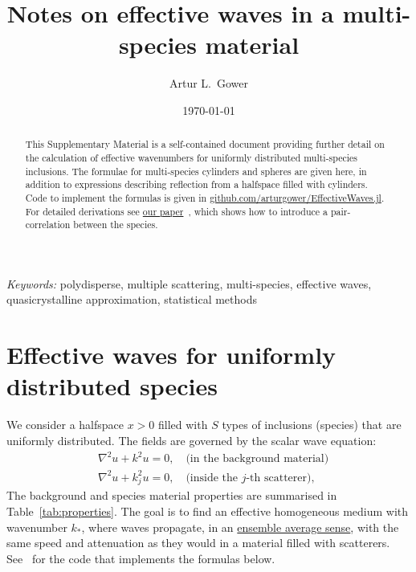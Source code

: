 \documentclass[12pt, a4paper]{article}
\begin{document}
\title{Notes on effective waves in a multi-species material}


\author[$\dagger$]{Artur L.\ Gower}


\date{\today}
\maketitle

\begin{abstract}
This Supplementary Material is a self-contained document providing further detail on the  calculation of effective wavenumbers for uniformly distributed multi-species inclusions. The formulae for multi-species cylinders and spheres are given here, in addition to expressions describing reflection from a halfspace filled with cylinders. Code to implement the formulas is given in \url{github.com/arturgower/EffectiveWaves.jl}.  For detailed derivations see \href{https://arxiv.org/abs/1712.05427}{our paper}~\parencite{gower_reflection_2017}, which shows how to introduce a pair-correlation between the species.
\end{abstract}

\noindent
{\textit{Keywords:} polydisperse, multiple scattering, multi-species, effective waves, quasicrystalline approximation, statistical methods }


\section{Effective waves for uniformly distributed species}
\label{sec:results}


We consider a halfspace $x>0$ filled with $S$ types of inclusions (species) that are uniformly distributed. The fields are governed by the scalar wave equation:
\begin{align}
  &\nabla^2 u + k^2 u = 0, \quad \text{(in the background material)} \\
  &\nabla^2 u + k^2_j u = 0, \quad \text{(inside the $j$-th scatterer)},
\end{align}
 The background and species material properties are summarised in Table~\ref{tab:properties}.
The goal is to find an effective homogeneous medium with wavenumber $k_*$, where waves propagate, in an
\href{https://en.wikipedia.org/wiki/Ensemble_average_(statistical_mechanics)}{ensemble average sense}, with the same speed and attenuation as they would in a material filled with scatterers. See~\cite{gower_effectivewaves.jl:_2017} for the code that implements the formulas below.
\end{document}
